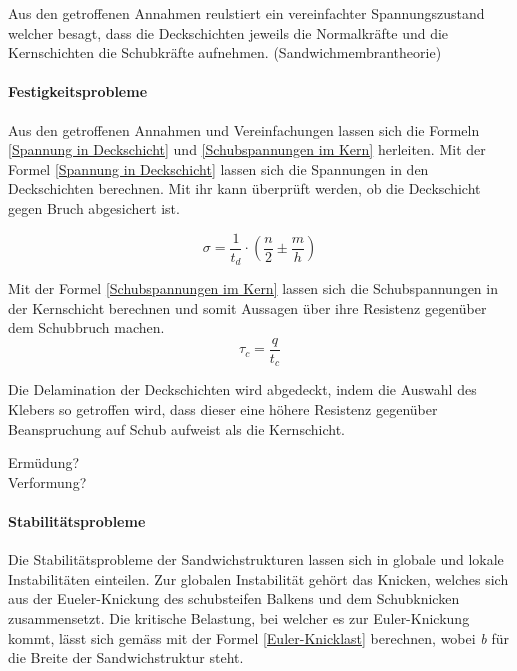     Aus den getroffenen Annahmen reulstiert ein vereinfachter Spannungszustand welcher besagt, dass die Deckschichten jeweils die Normalkräfte und die Kernschichten die Schubkräfte aufnehmen. (Sandwichmembrantheorie)

    \paragraph{Festigkeitsprobleme}
    Aus den getroffenen Annahmen und Vereinfachungen lassen sich die Formeln \ref{Spannung in Deckschicht} und \ref{Schubspannungen im Kern} herleiten. Mit der Formel \ref{Spannung in Deckschicht} lassen sich die Spannungen in den Deckschichten berechnen. Mit ihr kann überprüft werden, ob die Deckschicht gegen Bruch abgesichert ist.

    \begin{equation}
      \label{Spannung in Deckschicht}
      \sigma = \frac{1}{t_d}\cdot \left ( \frac{n}{2} \pm \frac{m}{h}\right )
    \end{equation}

    Mit der Formel \ref{Schubspannungen im Kern} lassen sich die Schubspannungen in der Kernschicht berechnen und somit Aussagen über ihre Resistenz gegenüber dem Schubbruch machen.
    \begin{equation}
      \label{Schubspannungen im Kern}
      \tau_c = \frac{q}{t_c}
    \end{equation}

    Die Delamination der Deckschichten wird abgedeckt, indem die Auswahl des Klebers so getroffen wird, dass dieser eine höhere Resistenz gegenüber Beanspruchung auf Schub aufweist als die Kernschicht.

    Ermüdung?\\

    Verformung?\\

    \paragraph{Stabilitätsprobleme}
    Die Stabilitätsprobleme der Sandwichstrukturen lassen sich in globale und lokale Instabilitäten einteilen. Zur globalen Instabilität gehört das Knicken, welches sich aus der Eueler-Knickung des schubsteifen Balkens und dem Schubknicken zusammensetzt.
    Die kritische Belastung, bei welcher es zur Euler-Knickung kommt, lässt sich gemäss \cite{ETH} mit der Formel \ref{Euler-Knicklast} berechnen, wobei \emph{b} für die Breite der Sandwichstruktur steht.

